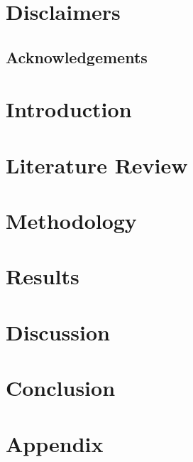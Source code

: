 \documentclass[12pt]{article}
\begin{document}


\section*{Disclaimers}

\pagebreak


\pagebreak

\begin{center}
\section*{Acknowledgements}
\end{center}


\pagebreak


\pagebreak


\pagebreak


\pagebreak


\section{Introduction}

\pagebreak

\section{Literature Review}

\pagebreak

\section{Methodology}

\pagebreak

\section{Results}

\pagebreak

\section{Discussion}

\pagebreak

\section{Conclusion}

\pagebreak





\pagebreak

\section*{Appendix}

\end{document}
